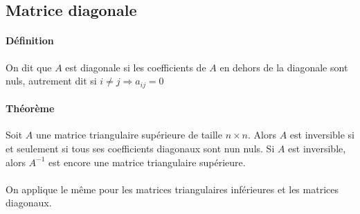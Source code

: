 %
\subsection{Matrice diagonale}
%
\paragraph{Définition} On dit que $A$ est diagonale si les coefficients de $A$ en dehors de la diagonale sont nuls, autrement dit si $i\neq j \Rightarrow a_{ij} = 0$

\paragraph{Théorème} Soit $A$ une matrice triangulaire supérieure de taille $n\times n$. Alors $A$ est inversible si et seulement si tous ses coefficients diagonaux sont nun nuls. Si $A$ est inversible, alors $A^{-1}$ est encore une matrice triangulaire supérieure.
\\\\
On applique le même pour les matrices triangulaires inférieures et les matrices diagonaux.

